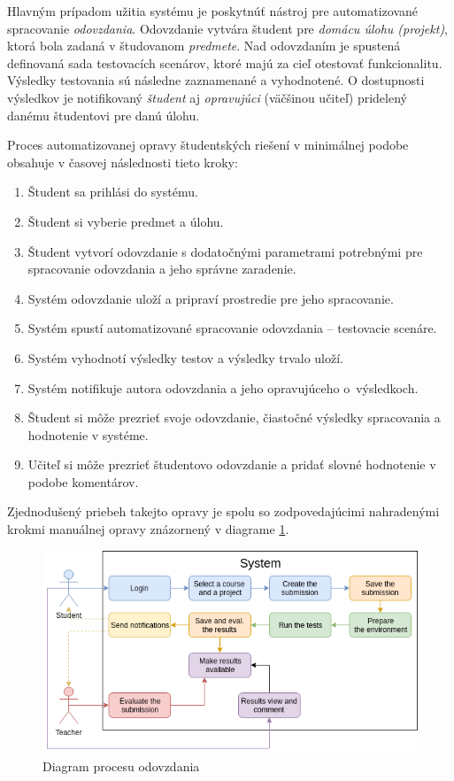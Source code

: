 \documentclass[
  digital, %
  oneside, %
  table,   %
  lof,     %
  lot,   %
]{fithesis3}
\begin{document}
Hlavným prípadom užitia systému je poskytnúť nástroj pre automatizované spracovanie \emph{odovzdania}. Odovzdanie vytvára študent pre \emph{domácu úlohu (projekt)}, ktorá bola zadaná v študovanom \emph{predmete}. Nad odovzdaním je spustená definovaná sada testovacích scenárov, ktoré majú za cieľ otestovať funkcionalitu. Výsledky testovania sú následne zaznamenané a vyhodnotené. O dostupnosti výsledkov je notifikovaný \emph{študent} aj \emph{opravujúci} (väčšinou učiteľ) pridelený danému študentovi pre danú úlohu.

Proces automatizovanej opravy študentských riešení v minimálnej podobe obsahuje v časovej následnosti tieto kroky:
\begin{enumerate}
    \item Študent sa prihlási do systému.
    \item Študent si vyberie predmet a úlohu.
    \item Študent vytvorí odovzdanie s dodatočnými parametrami potrebnými pre spracovanie odovzdania a jeho správne zaradenie.
    \item Systém odovzdanie uloží a pripraví prostredie pre jeho spracovanie.
    \item Systém spustí automatizované spracovanie odovzdania -- testovacie scenáre.
    \item Systém vyhodnotí výsledky testov a výsledky trvalo uloží.
    \item Systém notifikuje autora odovzdania a jeho opravujúceho o~výsledkoch.
    \item Študent si môže prezrieť svoje odovzdanie, čiastočné výsledky spracovania a hodnotenie v systéme.
    \item Učiteľ si môže prezrieť študentovo odovzdanie a pridať slovné hodnotenie v podobe komentárov. 
\end{enumerate}

Zjednodušený priebeh takejto opravy je spolu so zodpovedajúcimi nahradenými krokmi manuálnej opravy znázornený v diagrame \ref{fig:eval-process}.

\begin{figure}[!ht]
  \begin{center}
    \includegraphics[width=\textwidth]{imgs/eval-process.png}
  \end{center}
    \caption{Diagram procesu odovzdania}
    \label{fig:eval-process}
\end{figure}
\end{document}
